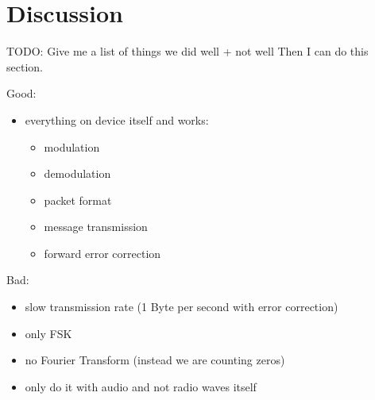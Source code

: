 \chapter{Discussion}

TODO: Give me a list of things we did well + not well
Then I can do this section.

Good:
\begin{itemize}
    \item everything on device itself and works:
    \begin{itemize}
        \item modulation
        \item demodulation
        \item packet format
        \item message transmission
        \item forward error correction
    \end{itemize}
\end{itemize}

Bad:
\begin{itemize}
    \item slow transmission rate (1 Byte per second with error correction)
    \item only FSK
    \item no Fourier Transform (instead we are counting zeros)
    \item only do it with audio and not radio waves itself
\end{itemize}


